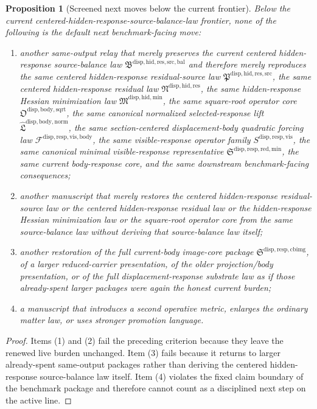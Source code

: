 \documentclass[11pt]{article}
\newcommand{\SourceBalanceLawPackage}{\mathfrak B^{\mathrm{disp,hid,res,src,bal}}}
\newcommand{\ResidualSourceLawPackage}{\mathfrak P^{\mathrm{disp,hid,res,src}}}
\newcommand{\ResidualLawPackage}{\mathfrak N^{\mathrm{disp,hid,res}}}
\newcommand{\HiddenMinimizationPackage}{\mathfrak M^{\mathrm{disp,hid,min}}}
\newcommand{\SquareRootOperatorCore}{\mathfrak O^{\mathrm{disp,body,sqrt}}}
\newcommand{\NormalizedLiftPackage}{\widehat{\mathfrak L}^{\mathrm{disp,body,norm}}}
\newcommand{\VisibleBodyForcingLaw}{\mathscr F^{\mathrm{disp,resp,vis,body}}}
\newcommand{\VisibleResponseOperator}{S^{\mathrm{disp,resp,vis}}}
\newcommand{\MinimalReducedStructure}{\mathfrak S^{\mathrm{disp,resp,red,min}}}
\newcommand{\CurrentBodyImageCore}{\mathfrak S^{\mathrm{disp,resp,cbimg}}}
\newtheorem{proposition}{Proposition}
\begin{document}
\begin{proposition}[Screened next moves below the current frontier]
Below the current centered-hidden-response-source-balance-law frontier, none of the following is the default next benchmark-facing move:
\begin{enumerate}
    \item another same-output relay that merely preserves the current centered hidden-response source-balance law \(\SourceBalanceLawPackage\) and therefore merely reproduces the same centered hidden-response residual-source law \(\ResidualSourceLawPackage\), the same centered hidden-response residual law \(\ResidualLawPackage\), the same hidden-response Hessian minimization law \(\HiddenMinimizationPackage\), the same square-root operator core \(\SquareRootOperatorCore\), the same canonical normalized selected-response lift \(\NormalizedLiftPackage\), the same section-centered displacement-body quadratic forcing law \(\VisibleBodyForcingLaw\), the same visible-response operator family \(\VisibleResponseOperator\), the same canonical minimal visible-response representative \(\MinimalReducedStructure\), the same current body-response core, and the same downstream benchmark-facing consequences;
    \item another manuscript that merely restores the centered hidden-response residual-source law or the centered hidden-response residual law or the hidden-response Hessian minimization law or the square-root operator core from the same source-balance law without deriving that source-balance law itself;
    \item another restoration of the full current-body image-core package \(\CurrentBodyImageCore\), of a larger reduced-carrier presentation, of the older projection/body presentation, or of the full displacement-response substrate law as if those already-spent larger packages were again the honest current burden;
    \item a manuscript that introduces a second operative metric, enlarges the ordinary matter law, or uses stronger promotion language.
\end{enumerate}
\end{proposition}

\begin{proof}
Items (1) and (2) fail the preceding criterion because they leave the renewed live burden unchanged. Item (3) fails because it returns to larger already-spent same-output packages rather than deriving the centered hidden-response source-balance law itself. Item (4) violates the fixed claim boundary of the benchmark package and therefore cannot count as a disciplined next step on the active line.
\end{proof}
\end{document}
